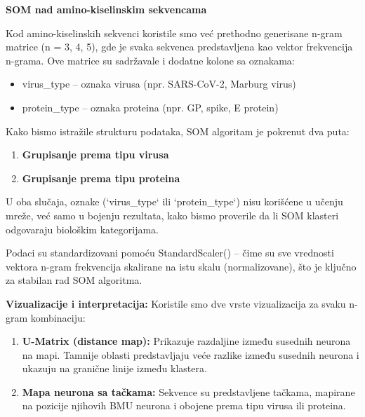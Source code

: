 \documentclass[a4paper,12pt]{article}
\begin{document}
\vspace{10pt}
\textbf{SOM nad amino-kiselinskim sekvencama}
\vspace{10pt}

Kod amino-kiselinskih sekvenci koristile smo već prethodno generisane n-gram matrice (n = 3, 4, 5), gde je svaka sekvenca predstavljena kao vektor frekvencija n-grama. Ove matrice su sadržavale i dodatne kolone sa oznakama:

\begin{itemize}
    \item virus\_type – oznaka virusa (npr. SARS-CoV-2, Marburg virus)
    \item protein\_type – oznaka proteina (npr. GP, spike, E protein)
\end{itemize}

Kako bismo istražile strukturu podataka, SOM algoritam je pokrenut dva puta:
\begin{enumerate}
  \item \textbf{Grupisanje prema tipu virusa}
  \item \textbf{Grupisanje prema tipu proteina} 
\end{enumerate}

U oba slučaja, oznake (`virus\_type` ili `protein\_type`) nisu korišćene u učenju mreže, već samo u bojenju rezultata, kako bismo proverile da li SOM klasteri odgovaraju biološkim kategorijama.

Podaci su standardizovani pomoću StandardScaler() – čime su sve vrednosti vektora n-gram frekvencija skalirane na istu skalu (normalizovane), što je ključno za stabilan rad SOM algoritma.

\textbf{Vizualizacije i interpretacija:}
Koristile smo dve vrste vizualizacija za svaku n-gram kombinaciju:
\begin{enumerate}
  \item \textbf{U-Matrix (distance map):} Prikazuje razdaljine između susednih neurona na mapi. Tamnije oblasti predstavljaju veće razlike između susednih neurona i ukazuju na granične linije između klastera.
  \item \textbf{Mapa neurona sa tačkama:} Sekvence su predstavljene tačkama, mapirane na pozicije njihovih BMU neurona i obojene prema tipu virusa ili proteina.
\end{enumerate}
\end{document}
